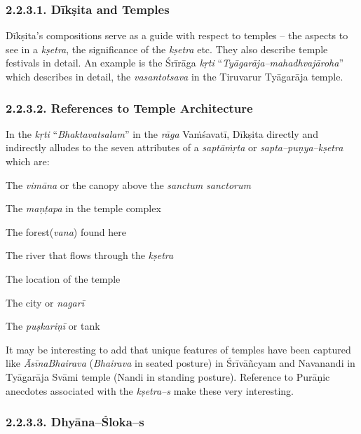 \subsubsection*{2.2.3.1. Dīkṣita and Temples}

Dīkṣita’s compositions serve as a guide with respect to temples – the aspects to see in a \textit{kṣetra}, the significance of the \textit{kṣetra} etc. They also describe temple festivals in detail. An example is the Śrīrāga\textit{ kṛti} “\textit{Tyāgarāja–mahadhvajāroha}” which describes in detail, the \textit{vasantotsava} in the Tiruvarur Tyāgarāja temple.


\subsubsection*{2.2.3.2. References to Temple Architecture}

In the \textit{kṛti} “\textit{Bhaktavatsalam}” in the \textit{rāga} Vaṁśavatī, Dīkṣita directly and indirectly alludes to the seven attributes of a \textit{saptāṁṛta} or \textit{sapta–puṇya–kṣetra} which are:

\item The \textit{vimāna} or the canopy above the \textit{sanctum sanctorum}

 \item The \textit{maṇṭapa} in the temple complex

 \item The forest(\textit{vana}) found here

 \item The river that flows through the \textit{kṣetra}

 \item The location of the temple

 \item The city or \textit{nagarī}

 \item The \textit{puṣkariṇī} or tank

It may be interesting to add that unique features of temples have been captured like \textit{ĀsīnaBhairava} (\textit{Bhairava} in seated posture) in Śrīvāñcyam and Navanandi in Tyāgarāja Svāmi temple (Nandi in standing posture). Reference to Purāṇic anecdotes associated with the \textit{kṣetra–s} make these very interesting.


\subsubsection*{2.2.3.3. Dhyāna–Śloka–s}

